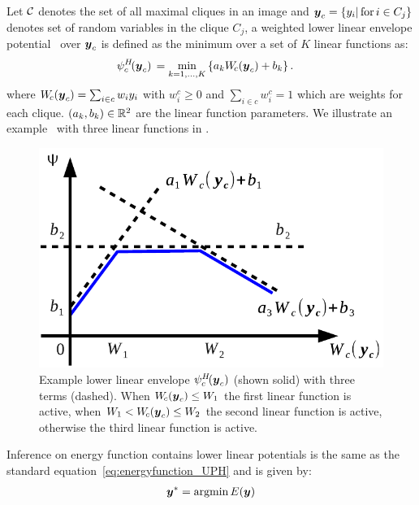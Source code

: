 \documentclass[sigconf, anonymous, review]{acmart}
\renewcommand{\cite}{\citep}
\begin{document}
Let ${\cal C}$ denotes the set of all maximal cliques in an image and
${\boldsymbol{y}}_c=\{y_i |\text{\,for\,} i \in C_j\}$ denotes set of random
variables in the clique $C_j$, a weighted lower linear envelope
potential~\cite{gouldlearning} over ${\boldsymbol{y}}_c$ is defined as the
minimum over a set of $K$ linear functions as:
%
\begin{align}
  \psi^H_c\!({\boldsymbol{y}}_c) \, &= \min_{k=1, \ldots, K} \left\{ a_k W_{\!c}({\boldsymbol{y}}_c) + b_k \right\}.
  \label{eqn:potential2}
\end{align}
%
where $W_{\!c}({\boldsymbol{y}}_c) = \sum_{i \in c} w_i y_i$ with $w^c_i \geq
0$ and $\sum_{i \in c} w^c_i = 1$ which are weights for each
clique. $(a_k, b_k) \in \mathbb{R}^2$ are the linear function
parameters. We illustrate an example~\cite{gouldlearning} with
three linear functions in .
\begin{figure}[ht]
  \centering
  \includegraphics[width=0.6\columnwidth]{Methodology/figures/not_redundant}
  \caption{\label{fig:nonredundant} Example lower linear envelope
    $\psi^H_c\!({\boldsymbol{y}}_c)$ (shown solid) with three terms (dashed).
    When $W_{\!c}({\boldsymbol{y}}_c) \leq W_1$ the first linear function is
    active, when $W_1 < W_{\!c}({\boldsymbol{y}}_c) \leq W_2$ the second
    linear function is active, otherwise the third linear
    function is active.}
\end{figure}

Inference on energy function contains lower linear potentials is
the same as the standard equation~\eqref{eq:energyfunction_UPH}
and is given by:
\begin{align}
  \label{eq:min_energy}
  {\boldsymbol{y}}^* = \mathop{\textrm{argmin}}E\!\left({\boldsymbol{y}}\right)
\end{align}
\end{document}
